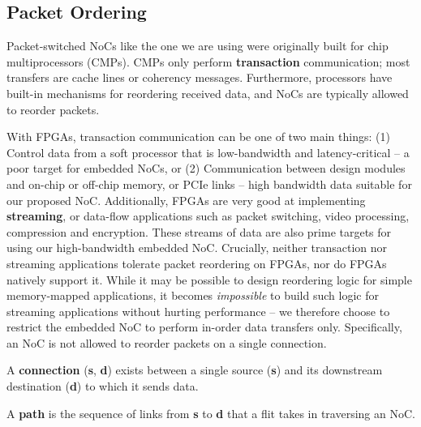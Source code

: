 %
%

%
\subsection{Packet Ordering}
%

Packet-switched NoCs like the one we are using were originally built for chip multiprocessors (CMPs).
CMPs only perform \textbf{transaction} communication; most transfers are cache lines or coherency messages.
Furthermore, processors have built-in mechanisms for reordering received data, and NoCs are typically allowed to reorder packets.

With FPGAs, transaction communication can be one of two main things: (1) Control data from a soft processor that is low-bandwidth and latency-critical -- a poor target for embedded NoCs, or (2) Communication between design modules and on-chip or off-chip memory, or PCIe links -- high bandwidth data suitable for our proposed NoC.
Additionally, FPGAs are very good at implementing \textbf{streaming}, or data-flow applications such as packet switching, video processing, compression and encryption.
These streams of data are also prime targets for using our high-bandwidth embedded NoC.
Crucially, neither transaction nor streaming applications tolerate packet reordering on FPGAs, nor do FPGAs natively support it.
While it may be possible to design reordering logic for simple memory-mapped applications, it becomes \textit{impossible} to build such logic for streaming applications without hurting performance -- we therefore choose to restrict the embedded NoC to perform in-order data transfers only.
Specifically, an NoC is not allowed to reorder packets on a single connection.
%
\begin{defn}
A \textbf{connection} (\textbf{s}, \textbf{d}) exists between a single source (\textbf{s}) and its downstream destination (\textbf{d}) to which it sends data.
\end{defn}
%
\begin{defn}
A \textbf{path} is the sequence of links from \textbf{s} to \textbf{d} that a flit takes in traversing an NoC.
\end{defn}
%

